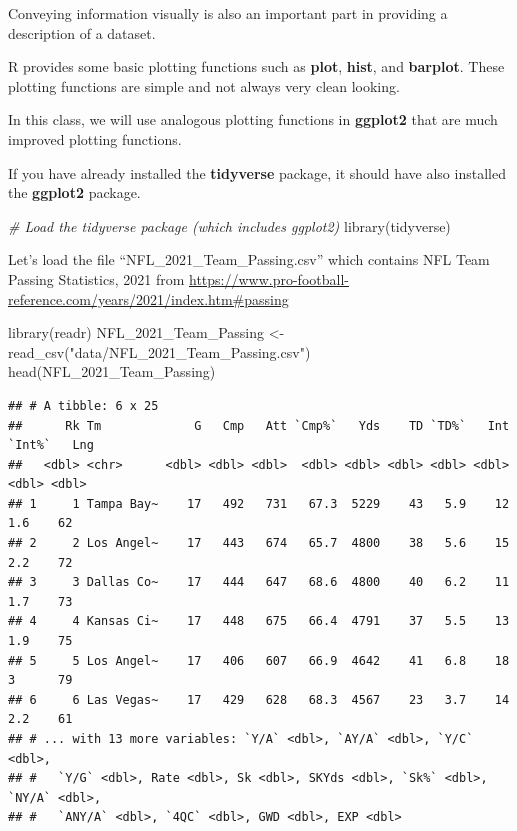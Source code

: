 \documentclass[
  11pt,
]{book}
\newenvironment{Shaded}{\begin{snugshade}}{\end{snugshade}}
\newcommand{\CommentTok}[1]{\textcolor[rgb]{0.56,0.35,0.01}{\textit{#1}}}
\newcommand{\FunctionTok}[1]{\textcolor[rgb]{0.00,0.00,0.00}{#1}}
\newcommand{\NormalTok}[1]{#1}
\newcommand{\OtherTok}[1]{\textcolor[rgb]{0.56,0.35,0.01}{#1}}
\newcommand{\StringTok}[1]{\textcolor[rgb]{0.31,0.60,0.02}{#1}}
\theoremstyle{definition}
\theoremstyle{definition}
\theoremstyle{definition}
\theoremstyle{definition}
\theoremstyle{remark}
\begin{document}
Conveying information visually is also an important part in providing a description of a dataset.

R provides some basic plotting functions such as \textbf{plot}, \textbf{hist}, and \textbf{barplot}. These plotting functions are simple and not always very clean looking.

In this class, we will use analogous plotting functions in \textbf{ggplot2} that are much improved plotting functions.

If you have already installed the \textbf{tidyverse} package, it should have also installed the \textbf{ggplot2} package.

\begin{Shaded}
\begin{Highlighting}[]
\CommentTok{\# Load the tidyverse package (which includes ggplot2)}
\FunctionTok{library}\NormalTok{(tidyverse)}
\end{Highlighting}
\end{Shaded}

Let's load the file ``NFL\_2021\_Team\_Passing.csv'' which contains NFL Team Passing Statistics, 2021 from \url{https://www.pro-football-reference.com/years/2021/index.htm\#passing}

\begin{Shaded}
\begin{Highlighting}[]
\FunctionTok{library}\NormalTok{(readr)}
\NormalTok{NFL\_2021\_Team\_Passing }\OtherTok{\textless{}{-}} \FunctionTok{read\_csv}\NormalTok{(}\StringTok{"data/NFL\_2021\_Team\_Passing.csv"}\NormalTok{)}
\FunctionTok{head}\NormalTok{(NFL\_2021\_Team\_Passing)}
\end{Highlighting}
\end{Shaded}

\begin{verbatim}
## # A tibble: 6 x 25
##      Rk Tm             G   Cmp   Att `Cmp%`   Yds    TD `TD%`   Int `Int%`   Lng
##   <dbl> <chr>      <dbl> <dbl> <dbl>  <dbl> <dbl> <dbl> <dbl> <dbl>  <dbl> <dbl>
## 1     1 Tampa Bay~    17   492   731   67.3  5229    43   5.9    12    1.6    62
## 2     2 Los Angel~    17   443   674   65.7  4800    38   5.6    15    2.2    72
## 3     3 Dallas Co~    17   444   647   68.6  4800    40   6.2    11    1.7    73
## 4     4 Kansas Ci~    17   448   675   66.4  4791    37   5.5    13    1.9    75
## 5     5 Los Angel~    17   406   607   66.9  4642    41   6.8    18    3      79
## 6     6 Las Vegas~    17   429   628   68.3  4567    23   3.7    14    2.2    61
## # ... with 13 more variables: `Y/A` <dbl>, `AY/A` <dbl>, `Y/C` <dbl>,
## #   `Y/G` <dbl>, Rate <dbl>, Sk <dbl>, SKYds <dbl>, `Sk%` <dbl>, `NY/A` <dbl>,
## #   `ANY/A` <dbl>, `4QC` <dbl>, GWD <dbl>, EXP <dbl>
\end{verbatim}
\end{document}
